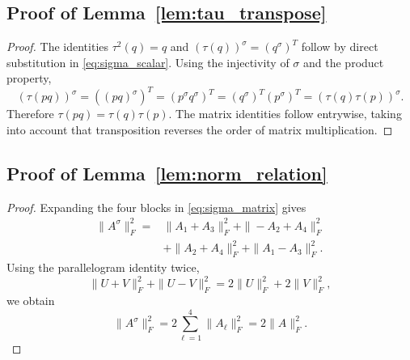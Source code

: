 \documentclass[12pt,a4paper]{article}
\theoremstyle{plain}
\theoremstyle{definition}
\theoremstyle{remark}
\begin{document}
\subsection{Proof of Lemma~\ref{lem:tau_transpose}}
\label{app:proof-tau-transpose}
\begin{proof}
The identities \(\tau^2(q)=q\) and \((\tau(q))^\sigma=(q^\sigma)^T\) follow by direct substitution in \eqref{eq:sigma_scalar}. Using the injectivity of \(\sigma\) and the product property,
\[
    (\tau(pq))^\sigma =((pq)^\sigma)^T =(p^\sigma q^\sigma)^T =(q^\sigma)^T(p^\sigma)^T =(\tau(q)\tau(p))^\sigma.
\]
Therefore \(\tau(pq)=\tau(q)\tau(p)\). The matrix identities follow entrywise, taking into account that transposition reverses the order of matrix multiplication.
\end{proof}

\subsection{Proof of Lemma~\ref{lem:norm_relation}}
\label{app:proof-norm-relation}
\begin{proof}
Expanding the four blocks in \eqref{eq:sigma_matrix} gives
\begin{align*}
    \|A^\sigma\|_F^2 ={}&\|A_1+A_3\|_F^2+\|-A_2+A_4\|_F^2\\
    &+\|A_2+A_4\|_F^2+\|A_1-A_3\|_F^2.
\end{align*}
Using the parallelogram identity twice,
\[
    \|U+V\|_F^2+\|U-V\|_F^2 =2\|U\|_F^2+2\|V\|_F^2,
\]
we obtain
\[
    \|A^\sigma\|_F^2 =2\sum_{\ell=1}^4\|A_\ell\|_F^2 =2\|A\|_F^2.
\]
\end{proof}
\end{document}
